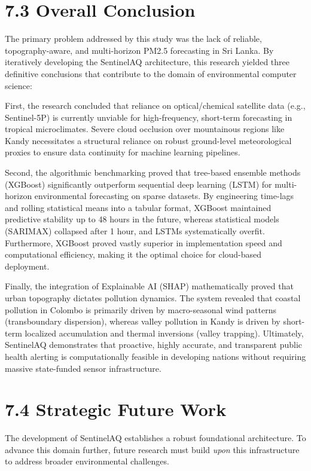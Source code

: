 \section{7.3 Overall Conclusion}\label{overall-conclusion}

The primary problem addressed by this study was the lack of reliable,
topography-aware, and multi-horizon PM2.5 forecasting in Sri Lanka. By
iteratively developing the SentinelAQ architecture, this research
yielded three definitive conclusions that contribute to the domain of
environmental computer science:

First, the research concluded that reliance on optical/chemical
satellite data (e.g., Sentinel-5P) is currently unviable for
high-frequency, short-term forecasting in tropical microclimates. Severe
cloud occlusion over mountainous regions like Kandy necessitates a
structural reliance on robust ground-level meteorological proxies to
ensure data continuity for machine learning pipelines.

Second, the algorithmic benchmarking proved that tree-based ensemble
methods (XGBoost) significantly outperform sequential deep learning
(LSTM) for multi-horizon environmental forecasting on sparse datasets.
By engineering time-lags and rolling statistical means into a tabular
format, XGBoost maintained predictive stability up to 48 hours in the
future, whereas statistical models (SARIMAX) collapsed after 1 hour, and
LSTMs systematically overfit. Furthermore, XGBoost proved vastly
superior in implementation speed and computational efficiency, making it
the optimal choice for cloud-based deployment.

Finally, the integration of Explainable AI (SHAP) mathematically proved
that urban topography dictates pollution dynamics. The system revealed
that coastal pollution in Colombo is primarily driven by macro-seasonal
wind patterns (transboundary dispersion), whereas valley pollution in
Kandy is driven by short-term localized accumulation and thermal
inversions (valley trapping). Ultimately, SentinelAQ demonstrates that
proactive, highly accurate, and transparent public health alerting is
computationally feasible in developing nations without requiring massive
state-funded sensor infrastructure.

\section{7.4 Strategic Future Work}\label{strategic-future-work}

The development of SentinelAQ establishes a robust foundational
architecture. To advance this domain further, future research must build
\emph{upon} this infrastructure to address broader environmental
challenges.

